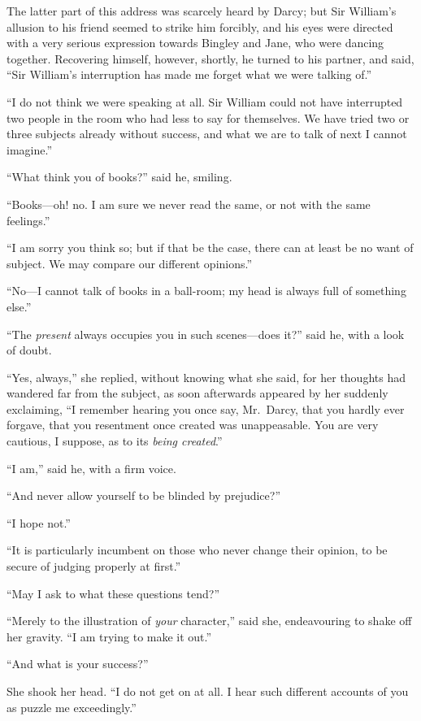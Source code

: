 The latter part of this address was scarcely heard by Darcy;
but Sir William's allusion to his friend seemed to strike him
forcibly, and his eyes were directed with a very serious
expression towards Bingley and Jane, who were dancing together.
Recovering himself, however, shortly, he turned to his partner,
and said, ``Sir William's interruption has made me forget what
we were talking of.''

``I do not think we were speaking at all.  Sir William could not
have interrupted two people in the room who had less to say for
themselves.  We have tried two or three subjects already without
success, and what we are to talk of next I cannot imagine.''

``What think you of books?'' said he, smiling.

``Books---oh! no.  I am sure we never read the same, or not with
the same feelings.''

``I am sorry you think so; but if that be the case, there can at
least be no want of subject.  We may compare our different
opinions.''

``No---I cannot talk of books in a ball-room; my head is always
full of something else.''

``The \emph{present} always occupies you in such scenes---does it?''
said he, with a look of doubt.

``Yes, always,'' she replied, without knowing what she said,
for her thoughts had wandered far from the subject, as soon
afterwards appeared by her suddenly exclaiming, ``I remember
hearing you once say, Mr.\ Darcy, that you hardly ever forgave,
that you resentment once created was unappeasable.  You are
very cautious, I suppose, as to its \emph{being created}.''

``I am,'' said he, with a firm voice.

``And never allow yourself to be blinded by prejudice?''

``I hope not.''

``It is particularly incumbent on those who never change their
opinion, to be secure of judging properly at first.''

``May I ask to what these questions tend?''

``Merely to the illustration of \emph{your} character,'' said she,
endeavouring to shake off her gravity.  ``I am trying to make
it out.''

``And what is your success?''

She shook her head.  ``I do not get on at all.  I hear such
different accounts of you as puzzle me exceedingly.''

